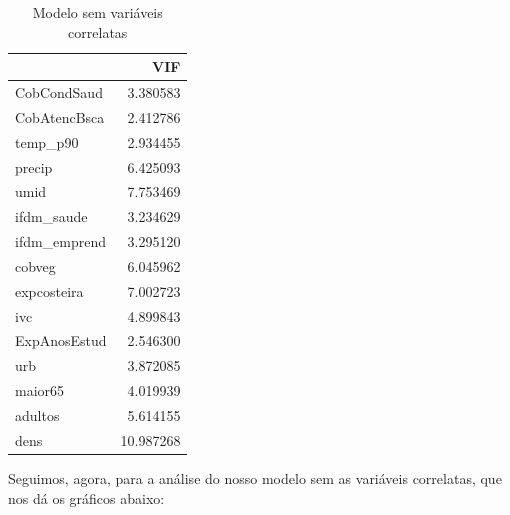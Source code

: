 \documentclass[12pt,a4paper]{article}\usepackage[]{graphicx}\usepackage[]{color}
\newenvironment{knitrout}{}{} %
\begin{document}
\begin{knitrout}
\begin{table}[H]
\caption{\label{tab:unnamed-chunk-9}Modelo sem variáveis correlatas}
\centering
\begin{tabular}[t]{l|r}
\hline
  & VIF\\
\hline
CobCondSaud & 3.380583\\
\hline
CobAtencBsca & 2.412786\\
\hline
temp\_p90 & 2.934455\\
\hline
precip & 6.425093\\
\hline
umid & 7.753469\\
\hline
ifdm\_saude & 3.234629\\
\hline
ifdm\_emprend & 3.295120\\
\hline
cobveg & 6.045962\\
\hline
expcosteira & 7.002723\\
\hline
ivc & 4.899843\\
\hline
ExpAnosEstud & 2.546300\\
\hline
urb & 3.872085\\
\hline
maior65 & 4.019939\\
\hline
adultos & 5.614155\\
\hline
dens & 10.987268\\
\hline
\end{tabular}
\end{table}


\end{knitrout}

Seguimos, agora, para a análise do nosso modelo sem as variáveis correlatas, que nos dá os gráficos abaixo:
\end{document}
